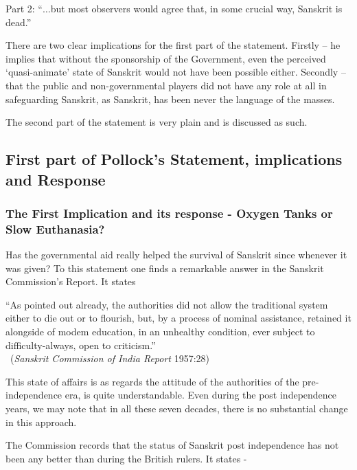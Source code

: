 Part 2:  “$\ldots$but most observers would agree that, in some crucial way, Sanskrit is dead.”

There are two clear implications for the first part of the statement. Firstly – he implies that without the sponsorship of the Government, even the perceived ‘quasi-animate’ state of Sanskrit would not have been possible either. Secondly – that the public and non-governmental players did not have any role at all in safeguarding Sanskrit, as Sanskrit, has been never the language of the masses. 

The second part of the statement is very plain and is discussed as such.

\subsection{First part of Pollock’s Statement, implications and Response}

\subsubsection{The First Implication and its response - Oxygen Tanks or Slow Euthanasia?}

Has the governmental aid really helped the survival of Sanskrit since whenever it was given? To this statement one finds a remarkable answer in the Sanskrit Commission's Report. It states 

\begin{myquote}
\eleven
 “As pointed out already, the authorities did not allow the traditional system either to die out or to flourish, but, by a process of nominal assistance, retained it alongside of modem education, in an unhealthy condition, ever subject to difficulty-always, open to criticism.”\\[-15pt] 
 
 ~\hfill({\sl Sanskrit Commission of India Report} 1957:28)
\end{myquote}
 
This state of affairs is as regards the attitude of the authorities of the pre-independence era, is quite understandable. Even during the post independence years, we may note that in all these seven decades, there is no substantial change in this approach. 

The Commission records that the status of Sanskrit post independence has not been any better than during the British rulers. It states -

